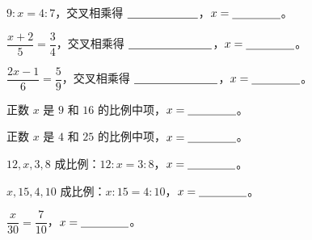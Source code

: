 \documentclass{exam-zh}
\begin{document}

\begin{problem}[points=4]
    $9:x=4:7$，交叉相乘得 $\underline{\hspace{2.2cm}}$，$x=\underline{\hspace{1.5cm}}$。
\end{problem}



\begin{problem}[points=4]
    $\dfrac{x+2}{5}=\dfrac{3}{4}$，交叉相乘得 $\underline{\hspace{2.6cm}}$，$x=\underline{\hspace{1.5cm}}$。
\end{problem}



\begin{problem}[points=4]
    $\dfrac{2x-1}{6}=\dfrac{5}{9}$，交叉相乘得 $\underline{\hspace{2.6cm}}$，$x=\underline{\hspace{1.5cm}}$。
\end{problem}



\begin{problem}[points=4]
    正数 $x$ 是 $9$ 和 $16$ 的比例中项，$x=\underline{\hspace{1.5cm}}$。
\end{problem}



\begin{problem}[points=4]
    正数 $x$ 是 $4$ 和 $25$ 的比例中项，$x=\underline{\hspace{1.5cm}}$。
\end{problem}



\begin{problem}[points=4]
    $12,x,3,8$ 成比例：$12:x=3:8$，$x=\underline{\hspace{1.5cm}}$。
\end{problem}



\begin{problem}[points=4]
    $x,15,4,10$ 成比例：$x:15=4:10$，$x=\underline{\hspace{1.5cm}}$。
\end{problem}



\begin{problem}[points=4]
    $\dfrac{x}{30}=\dfrac{7}{10}$，$x=\underline{\hspace{1.5cm}}$。
\end{problem}
\end{document}
